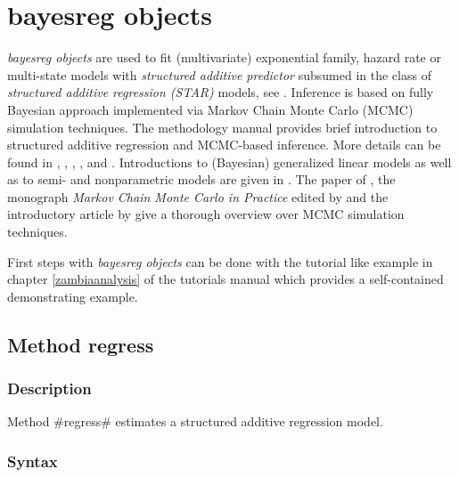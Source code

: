 \chapter{bayesreg objects}
\label{bayesreg} 

{\em bayesreg objects} are used to fit (multivariate) exponential family, hazard rate or multi-state models with {\em
structured additive predictor} subsumed in the class of {\em structured additive regression (STAR)} models, see .
Inference is based on fully Bayesian approach implemented via Markov Chain Monte Carlo (MCMC)
simulation techniques. The methodology manual provides brief introduction to structured additive regression and MCMC-based
inference. More details can be found in , , ,
,  and . Introductions to
(Bayesian) generalized linear models as well as to  semi- and
nonparametric models are given in .
The paper of , the monograph {\em Markov Chain Monte Carlo in Practice} edited by
 and the introductory article by  give a thorough overview over MCMC simulation
techniques.

First steps with {\em bayesreg objects} can be done with the
tutorial like example in chapter \ref*{zambiaanalysis} of the
tutorials manual which provides a self-contained demonstrating
example.

\clearpage

\section{Method regress}
\label{bayesregress} 

\subsection{Description}
\label{bayesregregressdescr}

Method #regress# estimates a structured additive regression model.

     

\subsection{Syntax}
\label{bayesregregresssyntax}

